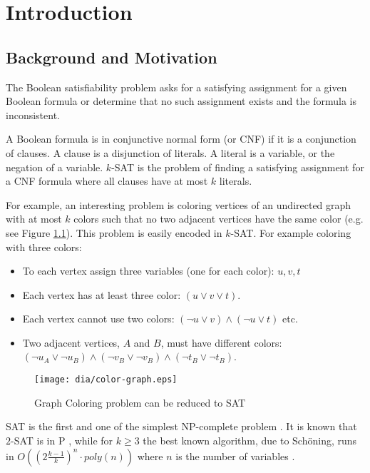 \chapter{Introduction}

\section{Background and Motivation}

The Boolean satisfiability problem asks for a satisfying
assignment for a given Boolean formula or determine
that no such assignment exists and the formula is inconsistent.

A Boolean formula is in conjunctive normal form (or
CNF) if it is a conjunction of clauses. A clause is a disjunction
of literals. A literal is a variable, or the negation of a
variable. $k$-SAT is the problem of finding a satisfying assignment
for a CNF formula where all clauses have at most $k$ literals.

For example, an interesting problem is coloring vertices
of an undirected graph with at most $k$ colors such that no
two adjacent vertices have the same color (e.g. see Figure
\ref{fig:color-graph}). This problem is easily encoded
in $k$-SAT. For example coloring with three colors:
\begin{itemize}
  \item To each vertex assign three variables (one for each color): $u, v, t$
  \item Each vertex has at least three color: $(u \lor v \lor t)$.
  \item Each vertex cannot use two colors:
  $(\neg u \lor v) \land (\neg u \lor t)$ etc.
  \item Two adjacent vertices, $A$ and $B$, must have different colors:
  $(\neg u_A \lor \neg u_B) \land (\neg v_B \lor \neg v_B) \land (\neg t_B \lor \neg t_B)$.
\end{itemize}

\begin{figure}
  \centering
  \texttt{[image: dia/color-graph.eps]}
  \caption{Graph Coloring problem can be reduced to SAT}
  \label{fig:color-graph}
\end{figure}

SAT is the first and one of the simplest NP-complete problem
\cite{Cook:1971:CTP:800157.805047}. It is known that
$2$-SAT is in P \cite{karp}, while for $k \ge 3$ the best
known algorithm, due to Sch\"{o}ning, runs in $O((2\frac{k -
1}{k})^n \cdot poly(n))$ where $n$ is the number of variables
\cite{Schoning:1999:PAK:795665.796524}.
 
